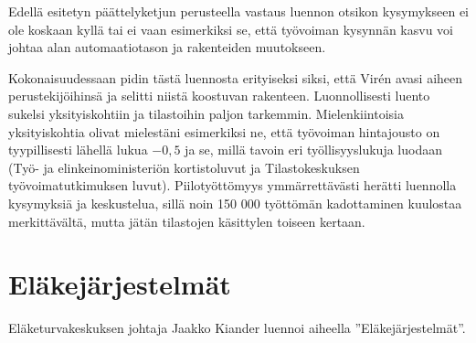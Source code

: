 \documentclass[12pt]{article}
\begin{document}
Edellä esitetyn päättelyketjun perusteella vastaus luennon otsikon kysymykseen ei ole koskaan kyllä tai ei vaan esimerkiksi se, että työvoiman kysynnän kasvu voi johtaa alan automaatiotason ja rakenteiden muutokseen.

Kokonaisuudessaan pidin tästä luennosta erityiseksi siksi, että Virén avasi aiheen perustekijöihinsä ja selitti niistä koostuvan rakenteen. Luonnollisesti luento sukelsi yksityiskohtiin ja tilastoihin paljon tarkemmin. Mielenkiintoisia yksityiskohtia olivat mielestäni esimerkiksi ne, että työvoiman hintajousto on tyypillisesti lähellä lukua $-0,5$ ja se, millä tavoin eri työllisyyslukuja luodaan (Työ- ja elinkeinoministeriön kortistoluvut ja Tilastokeskuksen työ\-voi\-ma\-tut\-ki\-muk\-sen luvut). Piilotyöttömyys ymmärrettävästi herätti luennolla kysymyksiä ja keskustelua, sillä noin 150 000 työttömän kadottaminen kuulostaa merkittävältä, mutta jätän tilastojen käsittylen toiseen kertaan.


\newpage
\section{Eläkejärjestelmät}

Eläketurvakeskuksen johtaja Jaakko Kiander luennoi aiheella ''Eläkejärjestelmät''.
\end{document}
